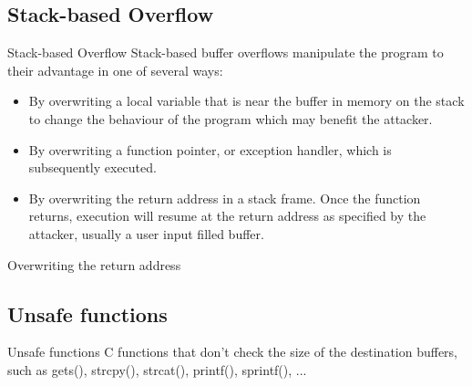 \subsection{Stack-based Overflow}
\begin{frame}{Stack-based Overflow}
	Stack-based buffer overflows manipulate the program to their advantage in one of several ways:
	\begin{itemize}
		\item By overwriting a local variable that is near the buffer in memory on the stack to change the behaviour of the program which may benefit the attacker.
		\item By overwriting a function pointer, or exception handler, which is subsequently executed.
		\item By overwriting the return address in a stack frame. Once the function returns, execution will resume at the return address as specified by the attacker, usually a user input filled buffer.
	\end{itemize}
\framebreak
	\begin{block}{Overwriting the return address}
	\end{block}
\end{frame}
\subsection{Unsafe functions}
\begin{frame}{Unsafe functions}
C functions that don't check the size of the destination buffers, such as gets(), strcpy(), strcat(), printf(), sprintf(), ...
\end{frame}
